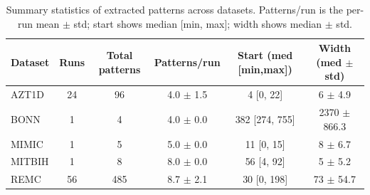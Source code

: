 \begin{table}[h]
\centering
\caption{Summary statistics of extracted patterns across datasets. Patterns/run is the per-run mean $\pm$ std; start shows median [min, max]; width shows median $\pm$ std.}
\label{tab:pattern_stats}
\begin{tabular}{|l|c|c|c|c|c|}
\hline
\textbf{Dataset} & \textbf{Runs} & \textbf{Total patterns} & \textbf{Patterns/run} & \textbf{Start (med [min,max])} & \textbf{Width (med $\pm$ std)} \\ 
\hline
AZT1D & 24 & 96 & 4.0 $\pm$ 1.5 & 4 [0, 22] & 6 $\pm$ 4.9 \\
BONN & 1 & 4 & 4.0 $\pm$ 0.0 & 382 [274, 755] & 2370 $\pm$ 866.3 \\
MIMIC & 1 & 5 & 5.0 $\pm$ 0.0 & 11 [0, 15] & 8 $\pm$ 6.7 \\
MITBIH & 1 & 8 & 8.0 $\pm$ 0.0 & 56 [4, 92] & 5 $\pm$ 5.2 \\
REMC & 56 & 485 & 8.7 $\pm$ 2.1 & 30 [0, 198] & 73 $\pm$ 54.7 \\
\hline
\end{tabular}
\end{table}